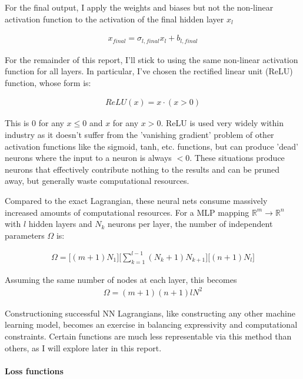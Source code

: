 \documentclass[]{article}
\begin{document}
For the final output, I apply the weights and biases but not the non-linear activation function to the activation of the final hidden layer $x_l$

\begin{eqnarray*}
	x_{final}= \sigma_{l,final}  x_l + b_{l,final}
\end{eqnarray*}

For the remainder of this report, I'll stick to using the same non-linear activation function for all layers. In particular, I've chosen the rectified linear unit (ReLU) function, whose form is:

\begin{eqnarray*}
	ReLU(x) = x\cdot (x>0)
\end{eqnarray*}

This is 0 for any $x\leq0$ and $x$ for any $x>0$. ReLU is used very widely within industry as it doesn't suffer from the 'vanishing gradient' problem of other activation functions like the sigmoid, tanh, etc. functions, but can produce 'dead' neurons where the input to a neuron is always $<0$. These situations produce neurons that effectively contribute nothing to the results and can be pruned away, but generally waste computational resources. 

Compared to the exact Lagrangian, these neural nets consume massively increased amounts of computational resources. For a MLP mapping $\mathbb{R}^m  \to \mathbb{R}^n$ with $l$ hidden layers and $N_k$ neurons per layer, the number of independent parameters $\Omega$ is:

\begin{eqnarray*}
	\Omega = \Big[ (m+1)N_1 \Big] \Big[\sum_{k=1}^{l-1} (N_k+1)N_{k+1}\Big] \Big[(n+1)N_{l}\Big]
\end{eqnarray*}

Assuming the same number of nodes at each layer, this becomes
\begin{eqnarray*}
	\Omega = (m+1)(n+1)lN^{2}
\end{eqnarray*}

Constructioning successful NN Lagrangians, like constructing any other machine learning model, becomes an exercise in balancing expressivity and computational constraints. Certain functions are much less representable via this method than others, as I will explore later in this report.


\paragraph{Loss functions}
\end{document}
